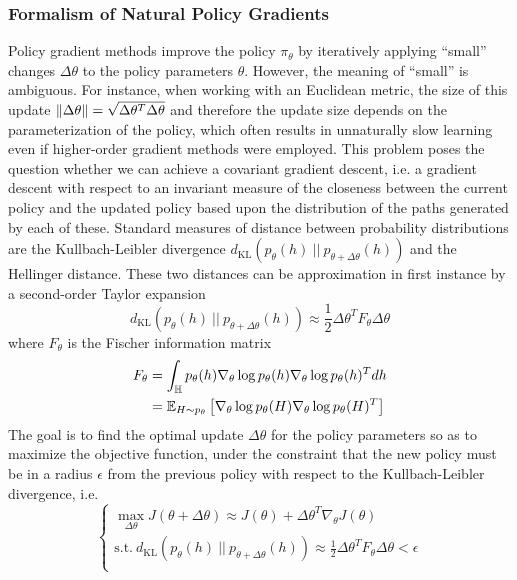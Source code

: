 \subsubsection{Formalism of Natural Policy Gradients}
Policy gradient methods improve the policy $\pi_\theta$ by iteratively applying ``small'' changes $\Delta \theta$ to the policy parameters $\theta$. However, the meaning of ``small'' is ambiguous. For instance, when working with an Euclidean metric, the size of this update $\norm{\Delta \theta} = \sqrt{\Delta\theta^T \Delta\theta}$ and therefore the update size depends on the parameterization of the policy, which often results in unnaturally slow learning even if higher-order gradient methods were employed. This problem poses the question whether we can achieve a covariant gradient descent, i.e. a gradient descent with respect to an invariant measure of the closeness between the current policy and the updated policy based upon the distribution of the paths generated by each of these. Standard measures of distance between probability distributions are the Kullbach-Leibler divergence $d_{\text{KL}}(p_\theta(h)\ ||\ p_{\theta + \Delta \theta}(h))$ and the Hellinger distance. These two distances can be approximation in first instance by a second-order Taylor expansion
\begin{equation*}
	d_{\text{KL}}(p_\theta(h)\ ||\ p_{\theta + \Delta \theta}(h)) \approx \frac{1}{2} \Delta\theta^T F_\theta \Delta\theta
\end{equation*} 
where $F_\theta$ is the Fischer information matrix
\begin{equation}
	\begin{split}
	F_\theta &= \int_{\H} p_\theta(h) \nabla_\theta\log p_\theta(h) \nabla_\theta\log p_\theta(h)^T dh\\
		&= \E[H\sim p_\theta]{\nabla_\theta\log p_\theta(H) \nabla_\theta\log p_\theta(H)^T}
	\end{split}
\end{equation}
The goal is to find the optimal update $\Delta \theta$ for the policy parameters so as to maximize the objective function, under the constraint that the new policy must be in a radius $\epsilon$ from the previous policy with respect to the Kullbach-Leibler divergence, i.e.
\begin{equation*}
	\begin{cases}
		\max_{\Delta\theta} J(\theta + \Delta \theta) \approx J(\theta) + \Delta \theta^T \nabla_\theta J(\theta)\\
		\text{s.t.}\ d_{\text{KL}}(p_\theta(h)\ ||\ p_{\theta + \Delta \theta}(h)) \approx \frac{1}{2} \Delta\theta^T F_\theta \Delta\theta < \epsilon\\  	
	\end{cases}
\end{equation*}
